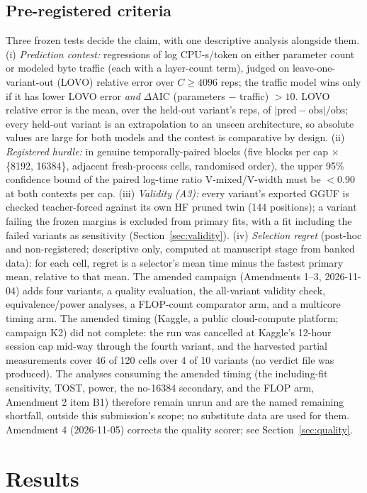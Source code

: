 \documentclass[10pt,letterpaper,twocolumn]{article}
\begin{document}
\subsection{Pre-registered criteria}
Three frozen tests decide the claim, with one descriptive analysis
alongside them. (i) \emph{Prediction contest:}
regressions of log CPU-s/token on either parameter count or
modeled byte traffic (each with a layer-count term), judged on
leave-one-variant-out (LOVO) relative error over $C\geq4096$ reps;
the traffic model wins only if it has lower LOVO error
\emph{and} $\Delta$AIC (parameters $-$ traffic) $> 10$. LOVO
relative error is the mean, over the held-out variant's reps, of
$|\text{pred}-\text{obs}|/\text{obs}$; every held-out variant is an extrapolation to an unseen architecture, so absolute values are large for both models and the contest is comparative by design.
(ii) \emph{Registered hurdle:} in genuine temporally-paired blocks
(five blocks per cap $\times$ \{8192, 16384\}, adjacent
fresh-process cells, randomised order), the upper 95\% confidence
bound of the paired log-time ratio V-mixed/V-width must be
$< 0.90$ at both contexts per cap. (iii) \emph{Validity (A3):}
every variant's exported GGUF is checked teacher-forced against
its own HF pruned twin (144 positions); a variant failing the
frozen margins is excluded from primary fits, with a fit including the failed variants as sensitivity (Section~\ref{sec:validity}).
(iv) \emph{Selection regret} (post-hoc and non-registered;
descriptive only, computed at manuscript stage from banked data):
for each cell, regret is a selector's mean time minus the
fastest primary mean, relative to that mean.
The amended campaign (Amendments 1--3, 2026-11-04) adds four
variants, a quality evaluation, the all-variant validity check,
equivalence/power analyses, a FLOP-count comparator arm, and a
multicore timing arm. The amended timing (Kaggle, a public
cloud-compute platform; campaign K2) did not complete: the run
was cancelled at Kaggle's 12-hour session cap mid-way through
the fourth variant, and the harvested partial measurements
cover 46 of 120 cells over 4 of 10 variants (no verdict file
was produced). The analyses consuming the amended timing (the
including-fit sensitivity, TOST, power, the no-16384 secondary,
and the FLOP arm, Amendment 2 item B1) therefore remain unrun
and are the named remaining shortfall, outside this
submission's scope; no substitute data are used for them.
Amendment 4 (2026-11-05) corrects the quality scorer; see
Section~\ref{sec:quality}.

\section{Results}
\end{document}
